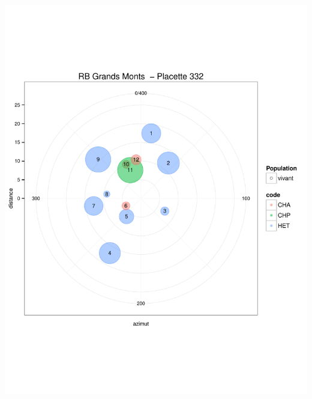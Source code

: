 \documentclass[a4paper]{book}\usepackage[]{graphicx}\usepackage[]{color}
\makeatletter
\def\maxwidth{ %
  \ifdim\Gin@nat@width>\linewidth
    \linewidth
  \else
    \Gin@nat@width
  \fi
}
\newenvironment{knitrout}{}{} %
\makeatother
\begin{document}
\begin{knitrout}
{\centering \includegraphics[width=\maxwidth]{Figures/PlanArbres-32} 

}





\end{knitrout}
\end{document}
